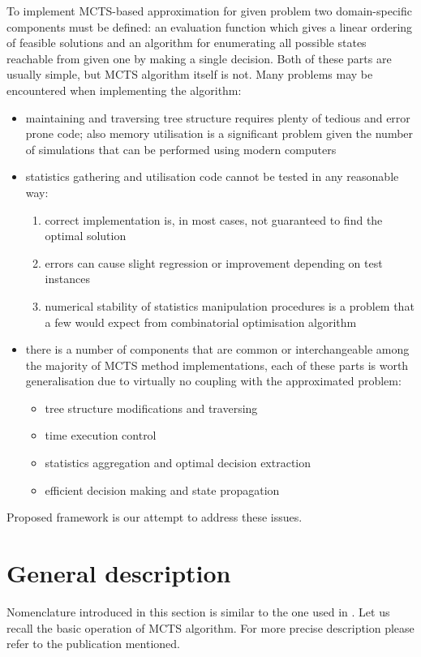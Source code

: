 To implement MCTS-based approximation for given problem two domain-specific
components must be defined: an evaluation function which gives a linear ordering
of feasible solutions and an algorithm for enumerating all possible states
reachable from given one by making a single decision.
Both of these parts are usually simple, but MCTS algorithm itself is not. Many
problems may be encountered when implementing the algorithm:
\begin{itemize}
  \item maintaining and traversing tree structure requires plenty of tedious
    and error prone code; also memory utilisation is a significant problem given the
    number of simulations that can be performed using modern computers
  \item statistics gathering and utilisation code cannot be tested in any reasonable way:
    \begin{enumerate}
      \item correct implementation is, in most cases, not guaranteed to find the optimal solution
      \item errors can cause slight regression or improvement depending on test instances
      \item numerical stability of statistics manipulation procedures is a
      problem that a few would expect from combinatorial optimisation algorithm
    \end{enumerate}
  \item there is a number of components that are common or interchangeable
    among the majority of MCTS method implementations, each of these parts is
    worth generalisation due to virtually no coupling with the approximated problem:
    \begin{itemize}
      \item tree structure modifications and traversing
      \item time execution control
      \item statistics aggregation and optimal decision extraction
      \item efficient decision making and state propagation
    \end{itemize}
\end{itemize}

Proposed framework is our attempt to address these issues.

\section{General description}
Nomenclature introduced in this section is similar to the one used in
\cite{MCTSsurvey}.  Let us recall the basic operation of MCTS algorithm. For
more precise description please refer to the publication mentioned.

